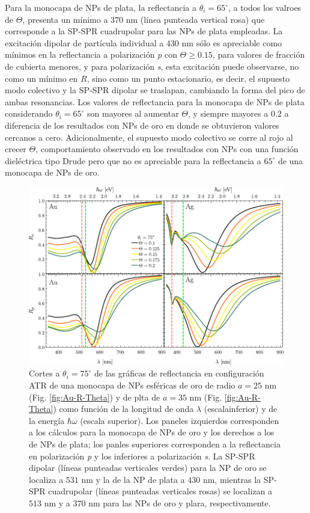 Para la monocapa de NPs de plata, la reflectancia a $\theta_i=65^\circ$, a todos los valroes de $\Theta$, presenta un mínimo a $370$ nm (línea punteada vertical rosa) que corresponde a la SP-SPR cuadrupolar para las NPs de plata empleadas. La excitación dipolar de partícula individual a $430$ nm sólo es apreciable como mínimos en la reflectancia a polarización \emph{p} con $\Theta \geq 0.15$, para valores de fracción de cubierta menores, y para polarización \emph{s}, esta excitación puede observarse, no como un mínimo en $R$, sino como un punto estacionario, es decir, el supuesto modo colectivo y la SP-SPR dipolar se traslapan, cambiando la forma del pico de ambas resonancias. Los valores de reflectancia para la monocapa de NPs de plata considerando $\theta_i=65^\circ$ son mayores al aumentar $\Theta$, y siempre mayores a $0.2$ a diferencia de los resultados con NPs de oro en donde se obtuvieron valores cercanos a cero. Adicionalmente, el supuesto modo colectivo se corre al rojo al crecer $\Theta$, comportamiento observado en los resultados con NPs con una función dieléctrica tipo Drude pero que no es apreciable para la reflectancia  a  $65^\circ$ de una monocapa de NPs de oro.	
	
	\begin{figure}[h!]\centering
	\includegraphics[scale=1]{2-Resultados/figs/6-AuThetaVar/0-cut75_Au_Aug.pdf}\vspace*{-.5em}
	\caption{Cortes a $\theta_i = 75^\circ$ de las gráficas de reflectancia  en configuración ATR  de una monocapa de NPs esféricas de oro de radio $a=25$ nm (Fig. \ref{fig:Au-R-Theta}) y de plta de $a=35$ nm (Fig. \ref{fig:Au-R-Theta}) como función de la longitud de onda $\lambda$ (escalainferior) y de la energía $\hbar\omega$ (escala superior). Los paneles izquierdos corresponden a los cálculos para la monocapa de NPs de oro y los derechos a los de NPs de plata; los panles superiores corresponden a la reflectancia en polarización \emph{p} y los inferiores a polarización \emph{s}. La SP-SPR dipolar (líneas punteadas verticales verdes) para la NP de oro se localiza a $531$ nm y la de la NP de plata a $430$ nm, mientras la SP-SPR cuadrupolar (líneas punteadas verticales rosas) se localizan a $513$ nm y a $370$ nm para las NPs de oro y plara, respectivamente.}\label{fig:AuAg-Cuts-75}
	\end{figure}	

